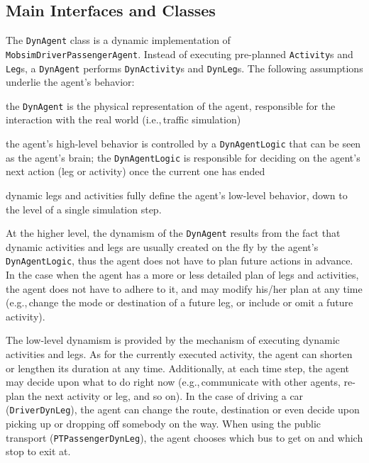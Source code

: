 \subsection{Main Interfaces and Classes}
The \lstinline$DynAgent$ class is a dynamic implementation of \lstinline$MobsimDriverPassengerAgent$. Instead of executing pre-planned \lstinline$Activity$s and \lstinline$Leg$s, a \lstinline$DynAgent$ performs \lstinline$DynActivity$s and \lstinline$DynLeg$s. The following assumptions underlie the agent's behavior:
%
\begin{compactitem}
	\item the \lstinline$DynAgent$ is the physical representation of the agent, responsible for the interaction with the real world (i.e.,\,traffic simulation)

	\item the agent's high-level behavior is controlled by a \lstinline$DynAgentLogic$ that can be seen as the agent's brain; the \lstinline$DynAgentLogic$ is responsible for deciding on the agent's next action (leg or activity) once the current one has ended
	
	\item dynamic legs and activities fully define the agent's low-level behavior, down to the level of a single simulation step.
\end{compactitem}
%
At the higher level, the dynamism of the \lstinline$DynAgent$ results from the fact that dynamic activities and legs are usually created on the fly by the agent's \lstinline$DynAgentLogic$, thus the agent does not have to plan future actions in advance. In the case when the agent has a more or less detailed plan of legs and activities, the agent does not have to adhere to it, and may modify his/her plan at any time (e.g.,\,change the mode or destination of a future leg, or include or omit a future activity).

The low-level dynamism is provided by the mechanism of executing dynamic activities and legs. As for the currently executed activity, the agent can shorten or lengthen its duration at any time. Additionally, at each time step, the agent may decide upon what to do right now (e.g.,\,communicate with other agents, re-plan the next activity or leg, and so on). In the case of driving a car (\lstinline$DriverDynLeg$), the agent can change the route, destination or even decide upon picking up or dropping off somebody on the way. When using the public transport (\lstinline$PTPassengerDynLeg$), the agent chooses which bus to get on and which stop to exit at.

